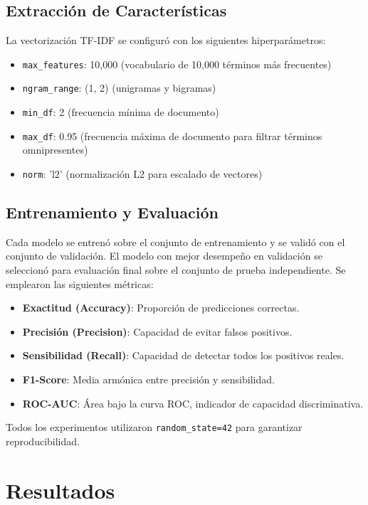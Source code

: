 \documentclass[12pt,a4paper]{article}
\begin{document}
\subsection{Extracción de Características}

La vectorización TF-IDF se configuró con los siguientes hiperparámetros:

\begin{itemize}
    \item \texttt{max\_features}: 10,000 (vocabulario de 10,000 términos más frecuentes)
    \item \texttt{ngram\_range}: (1, 2) (unigramas y bigramas)
    \item \texttt{min\_df}: 2 (frecuencia mínima de documento)
    \item \texttt{max\_df}: 0.95 (frecuencia máxima de documento para filtrar términos omnipresentes)
    \item \texttt{norm}: 'l2' (normalización L2 para escalado de vectores)
\end{itemize}

\subsection{Entrenamiento y Evaluación}

Cada modelo se entrenó sobre el conjunto de entrenamiento y se validó con el conjunto de validación. El modelo con mejor desempeño en validación se seleccionó para evaluación final sobre el conjunto de prueba independiente. Se emplearon las siguientes métricas:

\begin{itemize}
    \item \textbf{Exactitud (Accuracy)}: Proporción de predicciones correctas.
    \item \textbf{Precisión (Precision)}: Capacidad de evitar falsos positivos.
    \item \textbf{Sensibilidad (Recall)}: Capacidad de detectar todos los positivos reales.
    \item \textbf{F1-Score}: Media armónica entre precisión y sensibilidad.
    \item \textbf{ROC-AUC}: Área bajo la curva ROC, indicador de capacidad discriminativa.
\end{itemize}

Todos los experimentos utilizaron \texttt{random\_state=42} para garantizar reproducibilidad.

\section{Resultados}
\end{document}
